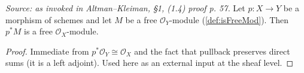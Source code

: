\begin{theorem}
  \label{thm:pullback_preserves_free}
  \textit{Source: as invoked in Altman--Kleiman, §1, (1.4) proof p. 57.}
  Let $p : X \to Y$ be a morphism of schemes and let $M$ be a free
  $\mathcal{O}_Y$-module (\cref{def:isFreeMod}). Then $p^* M$ is a free
  $\mathcal{O}_X$-module.
  \begin{proof}
    Immediate from $p^*\mathcal{O}_Y \cong \mathcal{O}_X$ and the fact that
    pullback preserves direct sums (it is a left adjoint). Used here as an
    external input at the sheaf level.
  \end{proof}
\end{theorem}

